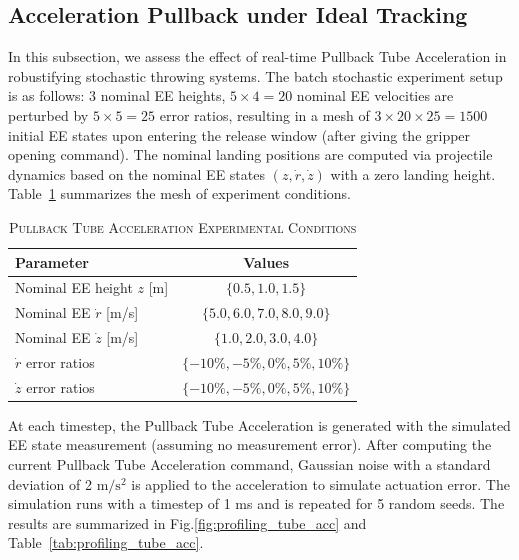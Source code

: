 \documentclass[letterpaper, 10 pt, conference]{ieeeconf} %
\begin{document}
\subsection{Acceleration Pullback under Ideal Tracking}
In this subsection, we assess the effect of real-time Pullback Tube Acceleration in robustifying stochastic throwing systems. The batch stochastic experiment setup is as follows: $3$ nominal EE heights, $5\times4=20$ nominal EE velocities are perturbed by $5\times5=25$ error ratios, resulting in a mesh of $3\times20\times25=1500$ initial EE states upon entering the release window (after giving the gripper opening command). The nominal landing positions are computed via projectile dynamics based on the nominal EE states $(z, \dot{r}, \dot{z})$ with a zero landing height. Table~\ref{tab:tube_conditions} summarizes the mesh of experiment conditions.

\begin{table}[ht!]
    \centering
    \caption{\small \textsc{Pullback Tube Acceleration Experimental Conditions}}
\label{tab:tube_conditions}
    \begin{tabular}{lc}
        \toprule
        \textbf{Parameter} & \textbf{Values} \\ 
        \midrule
        Nominal EE height $z$ [m] & $\{0.5, 1.0, 1.5\}$ \\
        Nominal EE $\dot{r}$ [m/s] & $\{5.0, 6.0, 7.0, 8.0, 9.0\}$ \\
        Nominal EE $\dot{z}$ [m/s] & $\{1.0, 2.0, 3.0, 4.0\}$ \\
        $\dot{r}$ error ratios & $\{-10\%, -5\%, 0\%, 5\%, 10\%\}$ \\
        $\dot{z}$ error ratios & $\{-10\%, -5\%, 0\%, 5\%, 10\%\}$ \\
        \bottomrule
    \end{tabular}
\end{table}

At each timestep, the Pullback Tube Acceleration is generated with the simulated EE state measurement (assuming no measurement error). After computing the current Pullback Tube Acceleration command, 
Gaussian noise with a standard deviation of 2 $\text{m}/\text{s}^2$  is applied to the acceleration to simulate actuation error. The simulation runs with a timestep of 1 ms and is repeated for 5 random seeds. The results are summarized in Fig.\ref{fig:profiling_tube_acc} and Table~\ref{tab:profiling_tube_acc}.
\end{document}
